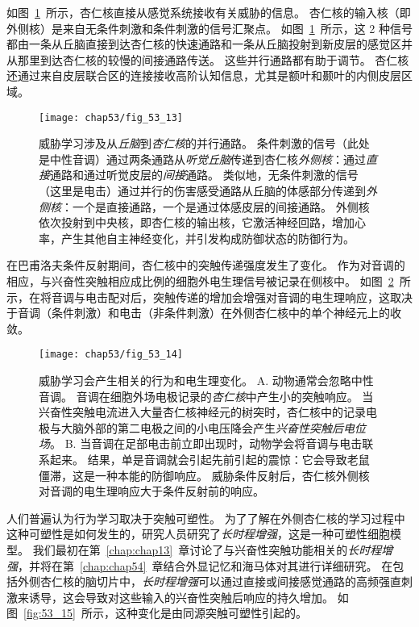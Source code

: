 如图~\ref{fig:53_13}~所示，杏仁核直接从感觉系统接收有关威胁的信息。
杏仁核的输入核（即外侧核）是来自无条件刺激和条件刺激的信号汇聚点。
如图~\ref{fig:53_13}~所示，这 2 种信号都由一条从丘脑直接到达杏仁核的快速通路和一条从丘脑投射到新皮层的感觉区并从那里到达杏仁核的较慢的间接通路传送。
这些并行通路都有助于调节。
杏仁核还通过来自皮层联合区的连接接收高阶认知信息，尤其是额叶和颞叶的内侧皮层区域。


\begin{figure}[htbp]
	\centering
	\texttt{[image: chap53/fig\_53\_13]}
	\caption{威胁学习涉及从\textit{丘脑}到\textit{杏仁核}的并行通路。
		条件刺激的信号（此处是中性音调）通过两条通路从\textit{听觉丘脑}传递到杏仁核\textit{外侧核}：通过\textit{直接}通路和通过听觉皮层的\textit{间接}通路。
		类似地，无条件刺激的信号（这里是电击）通过并行的伤害感受通路从丘脑的体感部分传递到\textit{外侧核}：一个是直接通路，一个是通过体感皮层的间接通路。
		外侧核依次投射到中央核，即杏仁核的输出核，它激活神经回路，增加心率，产生其他自主神经变化，并引发构成防御状态的防御行为\cite{kandel2007search}。}
	\label{fig:53_13}
\end{figure}


在巴甫洛夫条件反射期间，杏仁核中的突触传递强度发生了变化。
作为对音调的相应，与兴奋性突触相应成比例的细胞外电生理信号被记录在侧核中。
如图~\ref{fig:53_14}~所示，在将音调与电击配对后，突触传递的增加会增强对音调的电生理响应，这取决于音调（条件刺激）和电击（非条件刺激）在外侧杏仁核中的单个神经元上的收敛。


\begin{figure}[htbp]
	\centering
	\texttt{[image: chap53/fig\_53\_14]}
	\caption{威胁学习会产生相关的行为和电生理变化。
		A. 动物通常会忽略中性音调。
		音调在细胞外场电极记录的\textit{杏仁核}中产生小的突触响应。 
		当兴奋性突触电流进入大量杏仁核神经元的树突时，杏仁核中的记录电极与大脑外部的第二电极之间的小电压降会产生\textit{兴奋性突触后电位场}。
		B. 当音调在足部电击前立即出现时，动物学会将音调与电击联系起来。
		结果，单是音调就会引起先前引起的震惊：它会导致老鼠僵滞，这是一种本能的防御响应。
		威胁条件反射后，杏仁核外侧核对音调的电生理响应大于条件反射前的响应\cite{rogan2005distinct}。}
	\label{fig:53_14}
\end{figure}


人们普遍认为行为学习取决于突触可塑性。
为了了解在外侧杏仁核的学习过程中这种可塑性是如何发生的，研究人员研究了\textit{长时程增强}，这是一种可塑性细胞模型。
我们最初在第~\ref{chap:chap13}~章讨论了与兴奋性突触功能相关的\textit{长时程增强}，并将在第~\ref{chap:chap54}~章结合外显记忆和海马体对其进行详细研究。
在包括外侧杏仁核的脑切片中，\textit{长时程增强}可以通过直接或间接感觉通路的高频强直刺激来诱导，这会导致对这些输入的兴奋性突触后响应的持久增加。
如图~\ref{fig:53_15}~所示，这种变化是由同源突触可塑性引起的。


